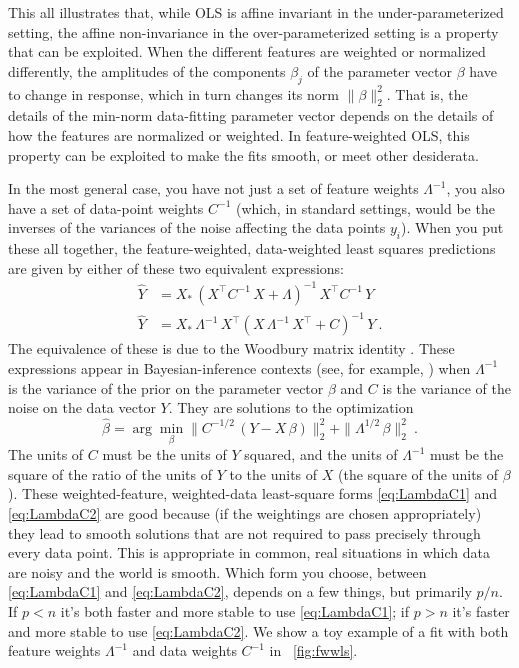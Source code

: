 \documentclass[12pt,letterpaper]{article}
\begin{document}
This all illustrates that, while OLS is affine invariant in the under-parameterized setting, the affine non-invariance in the over-parameterized setting is a property that can be exploited.
When the different features are weighted or normalized differently, the amplitudes of the components $\beta_j$ of the parameter vector $\beta$ have to change in response, which in turn changes its norm $\|\beta\|_2^2$.
That is, the details of the min-norm data-fitting parameter vector depends on the details of how the features are normalized or weighted.
In feature-weighted OLS, this property can be exploited to make the fits smooth, or meet other desiderata.

In the most general case, you have not just a set of feature weights $\Lambda^{-1}$, you also have a set of data-point weights $C^{-1}$ (which, in standard settings, would be the inverses of the variances of the noise affecting the data points $y_i$).
When you put these all together, the feature-weighted, data-weighted least squares predictions are given by either of these two equivalent expressions:
\begin{align}\label{eq:LambdaC1}
    \hat{Y} &= X_\ast\,(X^\top C^{-1}\,X + \Lambda)^{-1}\,X^\top C^{-1}\,Y
    \\ \label{eq:LambdaC2}
    \hat{Y} &= X_\ast\,\Lambda^{-1}\,X^\top (X\,\Lambda^{-1}\,X^\top + C)^{-1}\,Y
    ~.
\end{align}
The equivalence of these is due to the Woodbury matrix identity \citep{henderson1981deriving}. These expressions appear in Bayesian-inference contexts (see, for example, \citealt{products}) when $\Lambda^{-1}$ is the variance of the prior on the parameter vector $\beta$ and $C$ is the variance of the noise on the data vector $Y$.
They are solutions to the optimization
\begin{equation}
    \hat{\beta} = \arg\min_\beta \|C^{-1/2}\,(Y - X\,\beta)\|_2^2 + \|\Lambda^{1/2}\,\beta\|_2^2
    ~.
\end{equation}
The units of $C$ must be the units of $Y$ squared, and the units of $\Lambda^{-1}$ must be the square of the ratio of the units of $Y$ to the units of $X$ (the square of the units of $\beta$). These weighted-feature, weighted-data least-square forms \eqref{eq:LambdaC1} and \eqref{eq:LambdaC2} are good because (if the weightings are chosen appropriately) they lead to smooth solutions that are not required to pass precisely through every data point. This is appropriate in common, real situations in which data are noisy and the world is smooth. Which form you choose, between \eqref{eq:LambdaC1} and \eqref{eq:LambdaC2}, depends on a few things, but primarily $p/n$. If $p<n$ it's both faster and more stable to use \eqref{eq:LambdaC1}; if $p>n$ it's faster and more stable to use \eqref{eq:LambdaC2}. We show a toy example of a fit with both feature weights $\Lambda^{-1}$ and data weights $C^{-1}$ in \figurename~\ref{fig:fwwls}.
\end{document}

